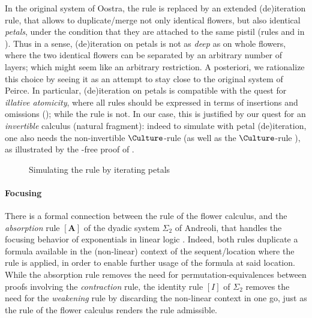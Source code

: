 In the original  system of Oostra, the  rule is replaced by an
extended (de)iteration rule, that allows to duplicate/merge not only identical
flowers, but also identical \emph{petals}, under the condition that they are
attached to the same pistil (rules 
and  in ). Thus in a sense, (de)iteration
on petals is not as \emph{deep} as on whole flowers, where the two identical
flowers can be separated by an arbitrary number of layers; which might seem like
an arbitrary restriction. A posteriori, we rationalize this choice by seeing it
as an attempt to stay close to the original system  of Peirce. In
particular, (de)iteration on petals is compatible with the quest for
\emph{illative atomicity}, where all rules should be expressed in terms of
insertions and omissions (); while the  rule is not.
In our case, this is justified by our quest for an \emph{invertible} calculus
(natural fragment): indeed to simulate  with petal (de)iteration, one
also needs the non-invertible $\Culture$-rule  (as well as the
$\Culture$-rule ), as illustrated by the -free proof of
.

\begin{figure}
  
  \caption{Simulating the  rule by iterating petals}
\end{figure}

\paragraph{Focusing}

There is a formal connection between the  rule of the flower
calculus, and the \emph{absorption} rule $[\mathbf{A}]$ of the dyadic system
$\Sigma_2$ of Andreoli, that handles the focusing behavior of exponentials in
linear logic . Indeed, both rules duplicate a formula
available in the (non-linear) context of the sequent/location where the rule is
applied, in order to enable further usage of the formula at said location. While
the absorption rule removes the need for permutation-equivalences between proofs
involving the \emph{contraction} rule, the identity rule $[I]$ of $\Sigma_2$
removes the need for the \emph{weakening} rule by discarding the non-linear
context in one go, just as the  rule of the flower calculus renders
the  rule admissible.

